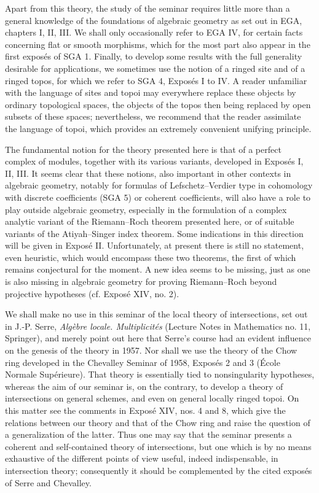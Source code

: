 \documentclass[11pt]{article}
\begin{document}
Apart from this theory, the study of the seminar requires little more than a general knowledge of the foundations of algebraic geometry as set out in EGA, chapters I, II, III. We shall only occasionally refer to EGA IV, for certain facts concerning flat or smooth morphisms, which for the most part also appear in the first exposés of SGA 1. Finally, to develop some results with the full generality desirable for applications, we sometimes use the notion of a ringed site and of a ringed topos, for which we refer to SGA 4, Exposés I to IV. A reader unfamiliar with the language of sites and topoi may everywhere replace these objects by ordinary topological spaces, the objects of the topos then being replaced by open subsets of these spaces; nevertheless, we recommend that the reader assimilate the language of topoi, which provides an extremely convenient unifying principle.

The fundamental notion for the theory presented here is that of a perfect complex of modules, together with its various variants, developed in Exposés I, II, III. It seems clear that these notions, also important in other contexts in algebraic geometry, notably for formulas of Lefschetz--Verdier type in cohomology with discrete coefficients (SGA 5) or coherent coefficients, will also have a role to play outside algebraic geometry, especially in the formulation of a complex analytic variant of the Riemann--Roch theorem presented here, or of suitable variants of the Atiyah--Singer index theorem. Some indications in this direction will be given in Exposé II. Unfortunately, at present there is still no statement, even heuristic, which would encompass these two theorems, the first of which remains conjectural for the moment. A new idea seems to be missing, just as one is also missing in algebraic geometry for proving Riemann--Roch beyond projective hypotheses (cf. Exposé XIV, no. 2).

We shall make no use in this seminar of the local theory of intersections, set out in J.-P. Serre, \emph{Algèbre locale. Multiplicités} (Lecture Notes in Mathematics no. 11, Springer), and merely point out here that Serre's course had an evident influence on the genesis of the theory in 1957. Nor shall we use the theory of the Chow ring developed in the Chevalley Seminar of 1958, Exposés 2 and 3 (École Normale Supérieure). That theory is essentially tied to nonsingularity hypotheses, whereas the aim of our seminar is, on the contrary, to develop a theory of intersections on general schemes, and even on general locally ringed topoi. On this matter see the comments in Exposé XIV, nos. 4 and 8, which give the relations between our theory and that of the Chow ring and raise the question of a generalization of the latter. Thus one may say that the seminar presents a coherent and self-contained theory of intersections, but one which is by no means exhaustive of the different points of view useful, indeed indispensable, in intersection theory; consequently it should be complemented by the cited exposés of Serre and Chevalley.
\end{document}
